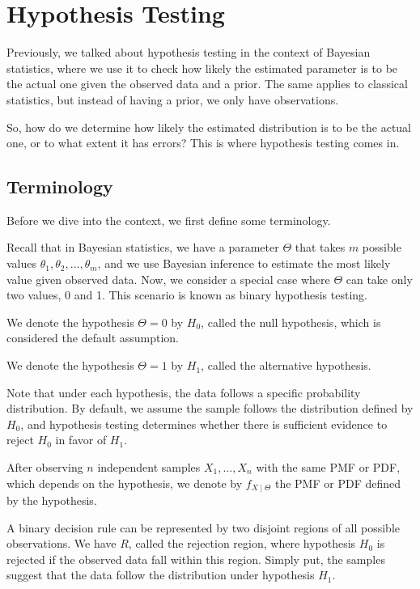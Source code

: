 \chapter{Hypothesis Testing}

Previously, we talked about hypothesis testing in the context of Bayesian statistics, where we use it to check how likely the estimated parameter is to be the actual one given the observed data and a prior. The same applies to classical statistics, but instead of having a prior, we only have observations.

So, how do we determine how likely the estimated distribution is to be the actual one, or to what extent it has errors? This is where hypothesis testing comes in.

\section{Terminology}
Before we dive into the context, we first define some terminology.

Recall that in Bayesian statistics, we have a parameter \(\Theta\) that takes \(m\) possible values \(\theta_1, \theta_2, \dots, \theta_m\), and we use Bayesian inference to estimate the most likely value given observed data. Now, we consider a special case where \(\Theta\) can take only two values, 0 and 1. This scenario is known as binary hypothesis testing.

We denote the hypothesis \(\Theta = 0\) by \(H_0\), called the null hypothesis, which is considered the default assumption.  

We denote the hypothesis \(\Theta = 1\) by \(H_1\), called the alternative hypothesis.  

Note that under each hypothesis, the data follows a specific probability distribution. By default, we assume the sample follows the distribution defined by \(H_0\), and hypothesis testing determines whether there is sufficient evidence to reject \(H_0\) in favor of \(H_1\).

After observing \(n\) independent samples \(X_1, \dots, X_n\) with the same PMF or PDF, which depends on the hypothesis, we denote by \(f_{X \mid \Theta}\) the PMF or PDF defined by the hypothesis.

A binary decision rule can be represented by two disjoint regions of all possible observations. We have \(R\), called the rejection region, where hypothesis \(H_0\) is rejected if the observed data fall within this region. Simply put, the samples suggest that the data follow the distribution under hypothesis \(H_1\).  

